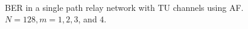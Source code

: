 \begin{figure}
{	 \\
}
\caption{BER in a single path relay network with TU channels using AF.  $N = 128, m = 1, 2, 3$, and $4$.}
\label{fig:sp_af_ber_plots_TU}
\end{figure}

